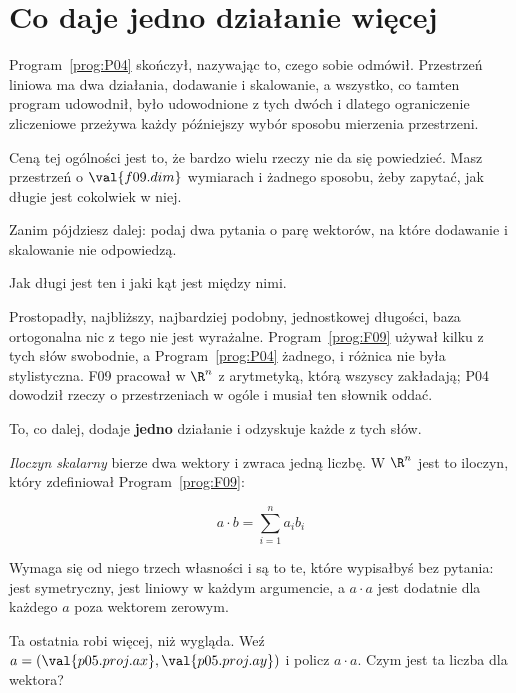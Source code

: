 \section{Co daje jedno działanie więcej}
\label{sec:P05-inner}

\begin{fr}
Program~\ref{prog:P04} skończył, nazywając to, czego sobie odmówił.
Przestrzeń liniowa ma dwa działania, dodawanie i skalowanie, a wszystko, co
tamten program udowodnił, było udowodnione z tych dwóch \dash{} i dlatego
ograniczenie zliczeniowe przeżywa każdy późniejszy wybór sposobu mierzenia
przestrzeni.

Ceną tej ogólności jest to, że bardzo wielu rzeczy nie da się powiedzieć. Masz
przestrzeń o $\val{f09.dim}$ wymiarach i żadnego sposobu, żeby zapytać, jak
długie jest cokolwiek w niej.

Zanim pójdziesz dalej: podaj dwa pytania o parę wektorów, na które dodawanie i
skalowanie nie odpowiedzą.
\nextframe
\end{fr}

\begin{fr}
\begin{ansblock}
Jak długi jest ten i jaki kąt jest między nimi.
\end{ansblock}

Prostopadły, najbliższy, najbardziej podobny, jednostkowej długości, baza
ortogonalna \dash{} nic z tego nie jest wyrażalne. Program~\ref{prog:F09}
używał kilku z tych słów swobodnie, a Program~\ref{prog:P04} żadnego, i różnica
nie była stylistyczna. F09 pracował w $\R^{n}$ z arytmetyką, którą wszyscy
zakładają; P04 dowodził rzeczy o przestrzeniach w ogóle i musiał ten słownik
oddać.

To, co dalej, dodaje \textbf{jedno} działanie i odzyskuje każde z tych słów.
\end{fr}

\begin{fr}
\emph{Iloczyn skalarny} bierze dwa wektory i zwraca jedną liczbę. W $\R^{n}$
jest to iloczyn, który zdefiniował Program~\ref{prog:F09}:

\[ a \cdot b = \sum_{i=1}^{n} a_i b_i \]

Wymaga się od niego trzech własności i są to te, które wypisałbyś bez pytania:
jest symetryczny, jest liniowy w każdym argumencie, a $a \cdot a$ jest dodatnie
dla każdego $a$ poza wektorem zerowym.

Ta ostatnia robi więcej, niż wygląda. Weź
$a = (\val{p05.proj.ax}, \val{p05.proj.ay})$ i policz $a \cdot a$. Czym jest ta
liczba dla wektora?
\nextframe
\end{fr}

